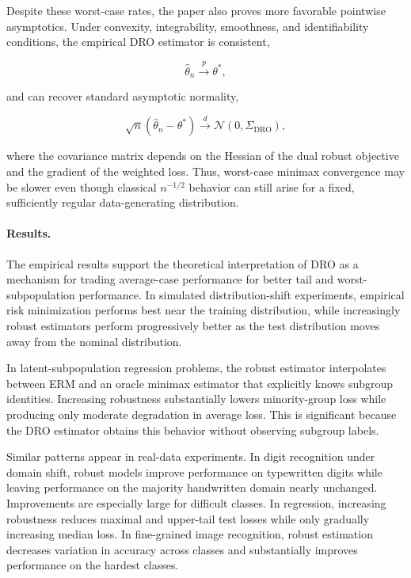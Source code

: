 \documentclass[11pt]{article}
\begin{document}
Despite these worst-case rates, the paper also proves more favorable pointwise asymptotics. Under convexity, integrability, smoothness, and identifiability conditions, the empirical DRO estimator is consistent,

\[
\widehat{\theta}_n
\overset{p}{\longrightarrow}
\theta^*,
\]

and can recover standard asymptotic normality,

\[
\sqrt{n}
\left(
\widehat{\theta}_n-\theta^*
\right)
\overset{d}{\longrightarrow}
\mathcal{N}(0,\Sigma_{\mathrm{DRO}}),
\]

where the covariance matrix depends on the Hessian of the dual robust objective and the gradient of the weighted loss. Thus, worst-case minimax convergence may be slower even though classical \(n^{-1/2}\) behavior can still arise for a fixed, sufficiently regular data-generating distribution.

\paragraph{Results.}

The empirical results support the theoretical interpretation of DRO as a mechanism for trading average-case performance for better tail and worst-subpopulation performance. In simulated distribution-shift experiments, empirical risk minimization performs best near the training distribution, while increasingly robust estimators perform progressively better as the test distribution moves away from the nominal distribution.

In latent-subpopulation regression problems, the robust estimator interpolates between ERM and an oracle minimax estimator that explicitly knows subgroup identities. Increasing robustness substantially lowers minority-group loss while producing only moderate degradation in average loss. This is significant because the DRO estimator obtains this behavior without observing subgroup labels.

Similar patterns appear in real-data experiments. In digit recognition under domain shift, robust models improve performance on typewritten digits while leaving performance on the majority handwritten domain nearly unchanged. Improvements are especially large for difficult classes. In regression, increasing robustness reduces maximal and upper-tail test losses while only gradually increasing median loss. In fine-grained image recognition, robust estimation decreases variation in accuracy across classes and substantially improves performance on the hardest classes.
\end{document}
